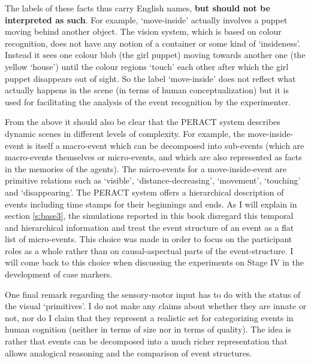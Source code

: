 The labels of these facts thus carry English names, {\bfseries but should not be interpreted as such}. For example, `move-inside' actually involves a puppet moving behind another object. The vision system, which is based on colour recognition, does not have any notion of a container or some kind of `insideness'. Instead it sees one colour blob (the girl puppet) moving towards another one (the yellow `house') until the colour regions `touch' each other after which the girl puppet disappears out of sight. So the label `move-inside' does not reflect what actually happens in the scene (in terms of human conceptualization) but it is used for facilitating the analysis of the event recognition by the experimenter.

From the above it should also be clear that the PERACT system describes dynamic scenes in different levels of complexity. For example, the move-inside-event is itself a macro-event which can be decomposed into sub-events (which are macro-events themselves or micro-events, and which are also represented as facts in the memories of the agents). The micro-events for a move-inside-event are primitive relations such as `visible', `distance-decreasing', `movement', `touching' and `disappearing'. The PERACT system offers a hierarchical description of events including time stamps for their beginnings and ends. As I will explain in section \ref{s:base3}, the simulations reported in this book disregard this temporal and hierarchical information and treat the event structure of an event as a flat list of micro-events. This choice was made in order to focus on the participant roles as a whole rather than on causal-aspectual parts of the event-structure. I will come back to this choice when discussing the experiments on Stage IV in the development of case markers.

One final remark regarding the sensory-motor input has to do with the status of the visual `primitives'. I do not make any claims about whether they are innate or not, nor do I claim that they represent a realistic set for categorizing events in human cognition (neither in terms of size nor in terms of quality). The idea is rather that events can be decomposed into a much richer representation that allows analogical reasoning and the comparison of event structures.


